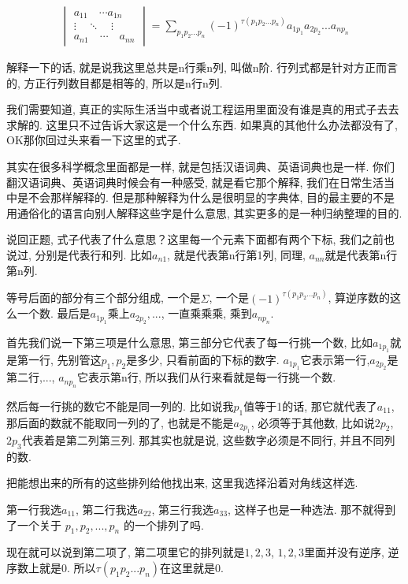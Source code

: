 \begin{align*}
  \begin{vmatrix}
  a_{11} \quad \cdots a_{1n} \\
  \vdots \quad \ddots \quad \vdots \\
  a_{n1} \quad \cdots \quad a_{nn}
  \end{vmatrix}
  = 
  \sum_{p_1p_2...p_n} (-1)^{\tau(p_1p_2...p_n)}a_{1p_1}a_{2p_2}...a_{np_n}
\end{align*}

解释一下的话, 就是说我这里总共是n行乘n列, 叫做n阶. 行列式都是针对方正而言的, 方正行列数目都是相等的, 所以是n行n列. 

我们需要知道, 真正的实际生活当中或者说工程运用里面没有谁是真的用式子去去求解的. 这里只不过告诉大家这是一个什么东西. 如果真的其他什么办法都没有了, OK那你回过头来看一下这里的式子. 

其实在很多科学概念里面都是一样, 就是包括汉语词典、英语词典也是一样. 你们翻汉语词典、英语词典时候会有一种感受, 就是看它那个解释, 我们在日常生活当中是不会那样解释的. 但是那种解释为什么是很明显的字典体, 目的最主要的不是用通俗化的语言向别人解释这些字是什么意思, 其实更多的是一种归纳整理的目的. 

说回正题, 式子代表了什么意思？这里每一个元素下面都有两个下标, 我们之前也说过, 分别是代表行和列. 比如$a_{n1}$, 就是代表第n行第1列, 同理, $a_{nn}$就是代表第n行第n列. 

等号后面的部分有三个部分组成, 一个是$\Sigma$, 一个是$(-1)^{\tau(p_1p_2...p_n)}$, 算逆序数的这么一个数. 最后是$a_{1p_1}$乘上$a_{2p_2}, ...$,  一直乘乘乘, 乘到$a_{np_n}$. 

首先我们说一下第三项是什么意思, 第三部分它代表了每一行挑一个数, 比如$a_{1p_1}$就是第一行, 先别管这$p_1, p_2$是多少, 只看前面的下标的数字. $a_{1p_1}$它表示第一行,$a_{2p_2}$是第二行,..., $a_{np_n}$它表示第n行, 所以我们从行来看就是每一行挑一个数. 

然后每一行挑的数它不能是同一列的. 比如说我$p_1$值等于1的话, 那它就代表了$a_{11}$,  那后面的数就不能取同一列的了, 也就是不能是$a_{2p_1}$, 必须等于其他数, 比如说$2p_2$, $2p_3$代表着是第二列第三列. 那其实也就是说, 这些数字必须是不同行, 并且不同列的数. 

把能想出来的所有的这些排列给他找出来, 这里我选择沿着对角线这样选. 

第一行我选$a_{11}$, 第二行我选$a_{22}$, 第三行我选$a_{33}$, 这样子也是一种选法. 那不就得到了一个关于 $p_1, p_2, ..., p_n$ 的一个排列了吗. 

现在就可以说到第二项了, 第二项里它的排列就是$1, 2, 3$, $1, 2, 3$里面并没有逆序, 逆序数上就是0. 所以$\tau(p_1p_2...p_n)$在这里就是0. 

